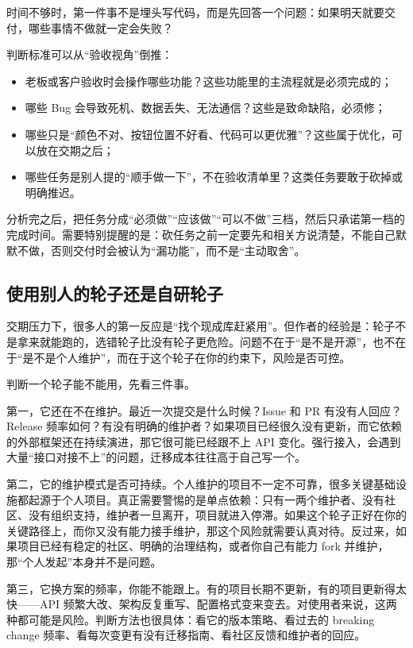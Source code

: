 时间不够时，第一件事不是埋头写代码，而是先回答一个问题：如果明天就要交付，哪些事情不做就一定会失败？

判断标准可以从“验收视角”倒推：

\begin{itemize}
\item 老板或客户验收时会操作哪些功能？这些功能里的主流程就是必须完成的；
\item 哪些 Bug 会导致死机、数据丢失、无法通信？这些是致命缺陷，必须修；
\item 哪些只是“颜色不对、按钮位置不好看、代码可以更优雅”？这些属于优化，可以放在交期之后；
\item 哪些任务是别人提的“顺手做一下”，不在验收清单里？这类任务要敢于砍掉或明确推迟。
\end{itemize}

分析完之后，把任务分成“必须做”“应该做”“可以不做”三档，然后只承诺第一档的完成时间。需要特别提醒的是：砍任务之前一定要先和相关方说清楚，不能自己默默不做，否则交付时会被认为“漏功能”，而不是“主动取舍”。

\subsection{使用别人的轮子还是自研轮子}

交期压力下，很多人的第一反应是“找个现成库赶紧用”。但作者的经验是：轮子不是拿来就能跑的，选错轮子比没有轮子更危险。问题不在于“是不是开源”，也不在于“是不是个人维护”，而在于这个轮子在你的约束下，风险是否可控。

判断一个轮子能不能用，先看三件事。

第一，它还在不在维护。最近一次提交是什么时候？Issue 和 PR 有没有人回应？Release 频率如何？有没有明确的维护者？如果项目已经很久没有更新，而它依赖的外部框架还在持续演进，那它很可能已经跟不上 API 变化。强行接入，会遇到大量“接口对接不上”的问题，迁移成本往往高于自己写一个。

第二，它的维护模式是否可持续。个人维护的项目不一定不可靠，很多关键基础设施都起源于个人项目。真正需要警惕的是单点依赖：只有一两个维护者、没有社区、没有组织支持，维护者一旦离开，项目就进入停滞。如果这个轮子正好在你的关键路径上，而你又没有能力接手维护，那这个风险就需要认真对待。反过来，如果项目已经有稳定的社区、明确的治理结构，或者你自己有能力 fork 并维护，那“个人发起”本身并不是问题。

第三，它换方案的频率，你能不能跟上。有的项目长期不更新，有的项目更新得太快——API 频繁大改、架构反复重写、配置格式变来变去。对使用者来说，这两种都可能是风险。判断方法也很具体：看它的版本策略、看过去的 breaking change 频率、看每次变更有没有迁移指南、看社区反馈和维护者的回应。

